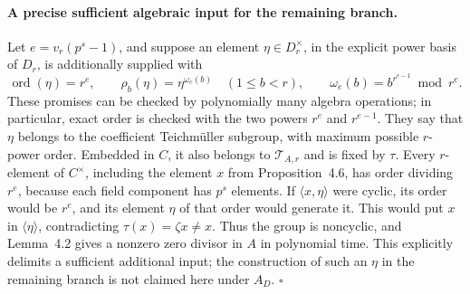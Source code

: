 \documentclass[11pt,a4paper]{article}
\begin{document}
\paragraph{A precise sufficient algebraic input for the remaining branch.}
Let \(e=v_r(p^s-1)\), and suppose an element
\(\eta\in D_r^\times\), in the explicit power basis of \(D_r\),
is additionally supplied with
\[
 \operatorname{ord}(\eta)=r^e,\qquad
 \rho_b(\eta)=\eta^{\omega_e(b)}
 \quad(1\leq b<r),
 \qquad
 \omega_e(b)=b^{r^{e-1}}\bmod r^e.
\]
These promises can be checked by polynomially many algebra
operations; in particular, exact order is checked with the two
powers \(r^e\) and \(r^{e-1}\).
They say that \(\eta\) belongs to the coefficient
Teichm\"uller subgroup, with maximum possible \(r\)-power order.
Embedded in \(C\), it also belongs to \(\mathcal T_{A,r}\)
and is fixed by \(\tau\).
Every \(r\)-element of \(C^\times\), including the element \(x\)
from Proposition~4.6, has order dividing \(r^e\), because each
field component has \(p^s\) elements.
If \(\langle x,\eta\rangle\) were cyclic, its order would be
\(r^e\), and its element \(\eta\) of that order would generate
it. This would put \(x\) in \(\langle\eta\rangle\), contradicting
\(\tau(x)=\zeta x\ne x\).
Thus the group is noncyclic, and Lemma~4.2 gives a nonzero zero
divisor in \(A\) in polynomial time.
This explicitly delimits a sufficient additional input; the
construction of such an \(\eta\) in the remaining branch is not
claimed here under \(A_D\).
\hfill\(\square\)
\end{document}
